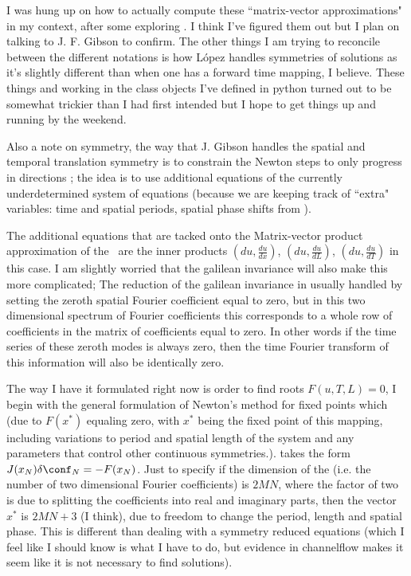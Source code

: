 I was hung up on how to actually compute these ``matrix-vector approximations"
in my context, after some exploring .
I think I've figured them out but I plan on talking to J. F. Gibson to confirm.
The other things I am trying to reconcile between the different notations is
how L{\'o}pez \etal{} handles symmetries of solutions as it's slightly different
than when one has a forward time mapping, I believe. These things and working in
the class objects I've defined in python turned out to be somewhat trickier
than I had first intended but I hope to get things up and running by the
weekend.

Also a note on symmetry, the way that J. Gibson
 handles the spatial and temporal
translation symmetry is to constrain the Newton steps to only progress in
directions ;
the idea is to use
additional equations of the currently underdetermined system of equations
(because we are keeping track of ``extra" variables: time and spatial periods,
spatial phase shifts from \rpo).

The additional equations that are tacked onto the Matrix-vector product approximation
of the \jacobianM\ are the inner products $( du, \frac{du}{dx} )$, $( du, \frac{du}{dL} )$, $( du, \frac{du}{dT} )$ in this
case. I am slightly worried that the galilean invariance will also make this more complicated; The reduction of the
galilean invariance in usually handled by setting the zeroth spatial Fourier coefficient equal to zero, but in this
two dimensional spectrum of Fourier coefficients this corresponds to a whole row of coefficients in the matrix
of coefficients equal to zero. In other words if the time series of these zeroth modes is always zero, then
the time Fourier transform of this information will also be identically zero.

The way I have it formulated right now is order to find roots $F(u,T,L) = 0$, I begin with the general formulation
of Newton's method for fixed points which (due to $F(x^*)$ equaling zero, with $x^*$ being the fixed point of this mapping, including
variations to period and spatial length of the system and any parameters that control other continuous symmetries.).
takes the form $J(x_N) \delta \conf_N = -F(x_N)$. Just to specify if the dimension of the {\statesp} (i.e. the number
of two dimensional Fourier coefficients) is $2MN$, where the factor of two is due to splitting the coefficients into
real and imaginary parts, then the vector $x^*$ is $2MN + 3$ (I think), due to freedom to change the period, length and
spatial phase. This is different than dealing with a symmetry reduced equations (which I feel like I should know is what I have
to do, but evidence in channelflow makes it seem like it is not necessary to find solutions).


